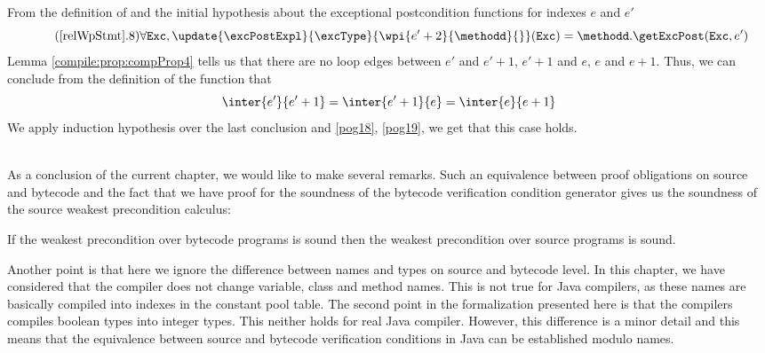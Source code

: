 \begin{description}
	      From the definition of \getExcPost{} and  the initial hypothesis about the exceptional 
	       postcondition functions for indexes $e$ and $e'$
             \begin{equation*}  \label{pog19}    \tag{\ref{relWpStmt}.8} \forall \mbox{\rm\texttt{Exc}} ,  \update{\excPostExpl}{\excType}{ \wpi{e'+2}{\methodd}{} }(\mbox{\rm\texttt{Exc}}) = 
                  \methodd.\getExcPost(\mbox{\rm\texttt{Exc}}, e' ) \end{equation*}
	       Lemma   \ref{compile:prop:compProp4} tells us that there are no loop edges between $e'$ and $e'+1$, $e'+1$ and $e$,
	       $e$ and $e+1$. Thus, we can conclude from the definition of the function \interOnly{} that   
             \begin{equation*}   \inter{e'}{e' + 1} = \inter{e'+1 }{e} = \inter{e}{e+1}   \end{equation*}
	      We apply  induction hypothesis over  the last conclusion 
	      and \eqref{pog18}, \eqref{pog19}, we get that this case holds.    
	      
	   
\end{description}
\Qed \\

As a conclusion of the current chapter, we would like to make several remarks. 
Such an equivalence between proof obligations on source and bytecode and the fact that
we have proof for the soundness of the bytecode verification condition generator
 gives us the soundness of the source  weakest precondition calculus:  
\begin{thm}\label{wpEq:bc2src}
If the weakest precondition over bytecode programs is sound  
then the weakest precondition over source programs is sound.
\end{thm}
Another point is that here we ignore the difference between names and types on  source and bytecode level. 
In this chapter, we have considered that the compiler  does not change  variable, class and method  names.
 This is not true for Java compilers, as these names are basically compiled into 
indexes in the constant pool table. The second point in the formalization presented here is that the compilers compiles boolean types into integer types. 
This neither holds for real Java compiler. However, this difference is a minor detail and this means that 
the equivalence between source and bytecode verification conditions in Java can be established modulo names. 

